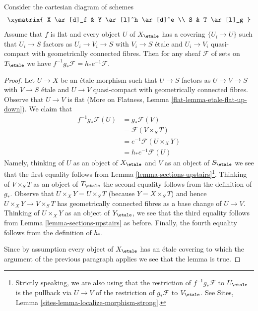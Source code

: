 \begin{lemma}
\label{lemma-base-change-f-star-general}
Consider the cartesian diagram of schemes
$$
\xymatrix{
X \ar[d]_f & Y \ar[l]^h \ar[d]^e \\
S & T \ar[l]_g
}
$$
Assume that $f$ is flat and every object $U$ of $X_\etale$ has
a covering $\{U_i \to U\}$ such that $U_i \to S$
factors as $U_i \to V_i \to S$ with $V_i \to S$
\'etale and $U_i \to V_i$ quasi-compact with
geometrically connected fibres.
Then for any sheaf $\mathcal{F}$ of sets on $T_\etale$ we have
$f^{-1}g_*\mathcal{F} = h_*e^{-1}\mathcal{F}$.
\end{lemma}

\begin{proof}
Let $U \to X$ be an \'etale morphism such that $U \to S$ factors as
$U \to V \to S$ with $V \to S$ \'etale and $U \to V$ quasi-compact
with geometrically connected fibres. Observe that $U \to V$ is flat
(More on Flatness, Lemma \ref{flat-lemma-etale-flat-up-down}).
We claim that
\begin{align*}
f^{-1}g_*\mathcal{F}(U)
& = g_*\mathcal{F}(V) \\
& = \mathcal{F}(V \times_S T) \\
& = e^{-1}\mathcal{F}(U \times_X Y) \\
& = h_*e^{-1}\mathcal{F}(U)
\end{align*}
Namely, thinking of $U$ as an object of $X_\etale$ and
$V$ as an object of $S_\etale$ we see that the first equality
follows from Lemma \ref{lemma-sections-upstairs}\footnote{Strictly
speaking, we are also using that the restriction of $f^{-1}g_*\mathcal{F}$
to $U_\etale$ is the pullback via $U \to V$ of the restriction of
$g_*\mathcal{F}$ to $V_\etale$. See
Sites, Lemma \ref{sites-lemma-localize-morphism-strong}.}.
Thinking of $V \times_S T$ as an object of $T_\etale$
the second equality follows from the definition of $g_*$.
Observe that $U \times_X Y = U \times_S T$ (because $Y = X \times_S T$)
and hence $U \times_X Y \to V \times_S T$
has geometrically connected fibres as a base change of $U \to V$.
Thinking of $U \times_X Y$ as an object of $Y_\etale$, we see that
the third equality  follows from Lemma \ref{lemma-sections-upstairs}
as before. Finally, the fourth equality follows from the definition
of $h_*$.

\medskip\noindent
Since by assumption every object of $X_\etale$ has an \'etale
covering to which the argument of the previous paragraph applies
we see that the lemma is true.
\end{proof}
